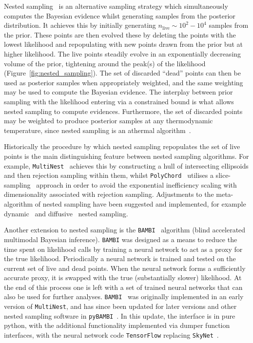 \documentclass[11pt]{article}
\begin{document}
Nested sampling~\cite{Skilling:2006gxv} is an alternative sampling strategy which simultaneously computes the Bayesian evidence whilst generating samples from the posterior distribution.
It achieves this by initially generating $n_\mathrm{live}\sim10^2-10^4$ samples from the prior. These points are then evolved these by deleting the points with the lowest likelihood and repopulating with new points drawn from the prior but at higher likelihood. The live points steadily evolve in an exponentially decreasing volume of the prior, tightening around the peak(s) of the likelihood (Figure~\ref{fig:nested_sampling}). The set of discarded ``dead'' points can then be used as posterior samples when appropriately weighted, and the same weighting may be used to compute the Bayesian evidence. The interplay between prior sampling with the likelihood entering via a constrained bound is what allows nested sampling to compute evidences. Furthermore, the set of discarded points may be weighted to produce posterior samples at any thermodynamic temperature, since nested sampling is an athermal algorithm~\cite{aeons}.

Historically the procedure by which nested sampling repopulates the set of live points is the main distinguishing feature between nested sampling algorithms. For example,
\texttt{MultiNest}~\cite{Feroz:2007kg,Feroz:2008xx,Feroz:2013hea} achieves this by constructing a hull of intersecting ellipsoids and then rejection sampling within them, whilst \texttt{PolyChord}~\cite{2015MNRAS.453.4384H,Handley:2015fda} utilises a slice-sampling~\cite{neal2003} approach in order to avoid the exponential inefficiency scaling with dimensionality associated with rejection sampling. Adjustments to the meta-algorithm of nested sampling have been suggested and implemented, for example dynamic~\cite{Higson:2019} and diffusive~\cite{Brewer2011} nested sampling.

Another extension to nested sampling is the \texttt{BAMBI}~\cite{Graff:2011gv} algorithm (blind accelerated multimodal Bayesian inference). \texttt{BAMBI} was designed as a means to reduce the time spent on likelihood calls by training a neural network to act as a proxy for the true likelihood. Periodically a neural network is trained and tested on the current set of live and dead points. When the neural network forms a sufficiently accurate proxy, it is swapped with the true (substantially slower) likelihood. At the end of this process one is left with a set of trained neural networks that can also be used for further analyses. \texttt{BAMBI}~\cite{Graff:2011gv} was originally implemented in an early version of \texttt{MultiNest}, and has since been updated for later versions and other nested sampling software in \texttt{pyBAMBI}~\cite{pybambi}. In this update, the interface is in pure python, with the additional functionality implemented via dumper function interfaces, with the neural network code \texttt{TensorFlow} replacing \texttt{SkyNet}~\cite{Graff:2013cla}.
\end{document}
